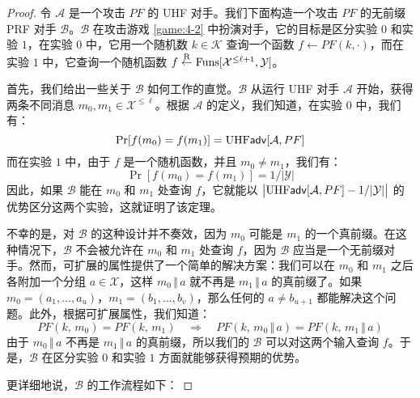 \begin{proof}
令 $\mathcal{A}$ 是一个攻击 $PF$ 的 UHF 对手。我们下面构造一个攻击 $PF$ 的无前缀 PRF 对手 $\mathcal{B}$。$\mathcal{B}$ 在攻击游戏 \ref{game:4-2} 中扮演对手，它的目标是区分实验 $0$ 和实验 $1$，在实验 $0$ 中，它用一个随机数 $k\in\mathcal{K}$ 查询一个函数 $f\leftarrow PF(k,\cdot)$，而在实验 $1$ 中，它查询一个随机函数 $f\overset{\rm R}\leftarrow{\rm Funs}[\mathcal{X}^{\leq\ell+1},\mathcal{Y}]$。

首先，我们给出一些关于 $\mathcal{B}$ 如何工作的直觉。$\mathcal{B}$ 从运行 UHF 对手 $\mathcal{A}$ 开始，获得两条不同消息 $m_0,m_1\in\mathcal{X}^{\leq\ell}$。根据 $\mathcal{A}$ 的定义，我们知道，在实验 $0$ 中，我们有：
\[
\Pr[f(m_0)=f(m_1)]={\rm UHF}\mathsf{adv}[\mathcal{A},PF]
\]
而在实验 $1$ 中，由于 $f$ 是一个随机函数，并且 $m_0\neq m_1$，我们有：
\[
\Pr[f(m_0)=f(m_1)]={1}/{|\mathcal{Y}|}
\]
因此，如果 $\mathcal{B}$ 能在 $m_0$ 和 $m_1$ 处查询 $f$，它就能以 $\big\lvert{\rm UHF}\mathsf{adv}[\mathcal{A},PF]-{1}/{|\mathcal{Y}|}\big\rvert$ 的优势区分这两个实验，这就证明了该定理。

不幸的是，对 $\mathcal{B}$ 的这种设计并不奏效，因为 $m_0$ 可能是 $m_1$ 的一个真前缀。在这种情况下，$\mathcal{B}$ 不会被允许在 $m_0$ 和 $m_1$ 处查询 $f$，因为 $\mathcal{B}$ 应当是一个无前缀对手。然而，可扩展的属性提供了一个简单的解决方案：我们可以在 $m_0$ 和 $m_1$ 之后各附加一个分组 $a\in\mathcal{X}$，这样 $m_0\,\Vert\,a$ 就不再是 $m_1\,\Vert\,a$ 的真前缀了。如果 $m_0=(a_1,\dots,a_u)$，$m_1=(b_1,\dots,b_v)$，那么任何的 $a\neq b_{u+1}$ 都能解决这个问题。此外，根据可扩展属性，我们知道：
\[
PF(k,\,m_0)=PF(k,\,m_1)
\quad\Longrightarrow\quad
PF(k,\,m_0\,\Vert\,a)=PF(k,\,m_1\,\Vert\,a)
\]
由于 $m_0\,\Vert\,a$ 不再是 $m_1\,\Vert\,a$ 的真前缀，所以我们的 $\mathcal{B}$ 可以对这两个输入查询 $f$。于是，$\mathcal{B}$ 在区分实验 $0$ 和实验 $1$ 方面就能够获得预期的优势。

更详细地说，$\mathcal{B}$ 的工作流程如下：

\vspace{5pt}


\end{proof}
